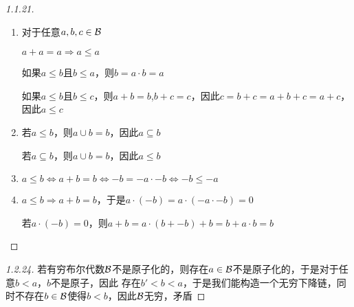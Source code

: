 \documentclass[11pt]{article}
\begin{document}
\begin{proof}[1.1.21]
\begin{enumerate}
\item 对于任意\(a,b,c\in\mathcal{B}\)

\(a+a=a\Rightarrow a\le a\)

如果\(a\le b\)且\(b\le a\)，则\(b=a\cdot b=a\)

如果\(a\le b\)且\(b\le c\)，则\(a+b=b\),\(b+c=c\)，因此\(c=b+c=a+b+c=a+c\)，因此\(a\le c\)
\item 若\(a\le b\)，则\(a\cup b=b\)，因此\(a\subseteq b\)

若\(a\subseteq b\)，则\(a\cup b=b\)，因此\(a\le b\)
\item \(a\le b\Leftrightarrow a+b=b\Leftrightarrow -b=-a\cdot -b\Leftrightarrow-b\le -a\)
\item \(a\le b\Rightarrow a+b=b\)，于是\(a\cdot(-b)=a\cdot(-a\cdot -b)=0\)

若\(a\cdot(-b)=0\)，则\(a+b=a\cdot(b+-b)+b=b+a\cdot b=b\)
\end{enumerate}
\end{proof}

\begin{proof}[1.2.24]
若有穷布尔代数\(\mathcal{B}\)不是原子化的，则存在\(a\in\mathcal{B}\)不是原子化的，于是对于任意\(b<a\)，\(b\)不是原子，因此
存在\(b'<b<a\)，于是我们能构造一个无穷下降链，同时不存在\(b\in\mathcal{B}\)使得\(b<b\)，因此\(\mathcal{B}\)无穷，矛盾
\end{proof}
\end{document}
